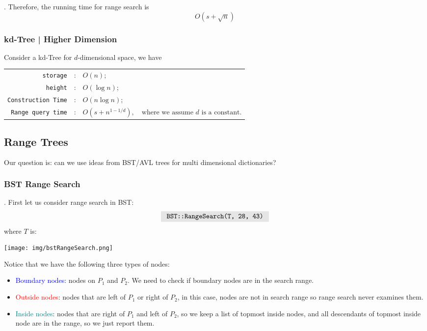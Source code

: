 \documentclass{article}
\begin{document}
\begin{result}[].
    Therefore, the running time for range search is 
    \[ O(s + \sqrt{n}) \]
\end{result}

\subsubsection{kd-Tree | Higher Dimension} 

Consider a kd-Tree for $d$-dimensional space, we have \begin{center}
    \begin{tabular}{rcl}
        \texttt{storage} & : & $O(n)$; \\ 
        \texttt{height} & : & $O(\log n)$; \\ 
        \texttt{Construction Time} & : & $O(n \log n)$; \\ 
        \texttt{Range query time} & : & $\displaystyle O \left( s + n^{1 - 1/d} \right), \quad \text{where we assume $d$ is a constant}$.  
    \end{tabular}    
\end{center}

\subsection{Range Trees}

\begin{Question}{}
    Our question is: can we use ideas from BST/AVL trees for multi dimensional dictionaries? 
\end{Question}

\subsubsection{BST Range Search} 

\begin{examplee}[].
    First let us consider range search in BST: 
    \[ \code{ BST::RangeSearch(T, 28, 43) } \] 
    where $T$ is: \begin{center}
        \texttt{[image: img/bstRangeSearch.png]}
    \end{center}
    Notice that we have the following three types of nodes: \begin{itemize}
        \item \textcolor{blue}{Boundary nodes}: nodes on $P_1$ and $P_2$. We need to check if boundary nodes are in the search range.  
        \item \textcolor{red}{Outside nodes}: nodes that are left of $P_1$ or right of $P_2$, in this case, nodes are not in search range so range search never examines them. 
        \item \textcolor{teal}{Inside nodes}: nodes that are right of $P_1$ and left of $P_2$, so we keep a list of topmost inside nodes, and all descendants of topmost inside node are in the range, so we just report them. 
    \end{itemize}
\end{examplee}
\end{document}
